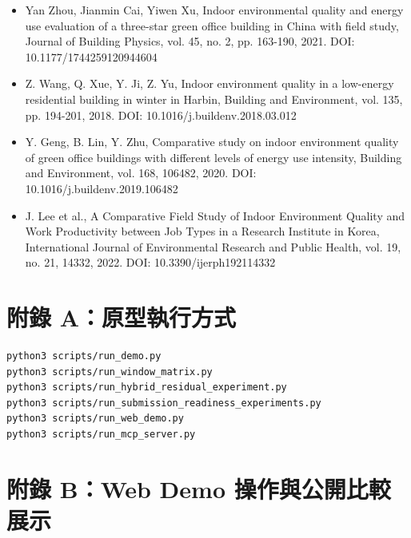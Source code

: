\documentclass[12pt,a4paper]{article}
\begin{document}
\begin{itemize}
\item [22] Yan Zhou, Jianmin Cai, Yiwen Xu, Indoor environmental quality and energy use evaluation of a three-star green office building in China with field study, Journal of Building Physics, vol. 45, no. 2, pp. 163-190, 2021. DOI: 10.1177/1744259120944604
\item [23] Z. Wang, Q. Xue, Y. Ji, Z. Yu, Indoor environment quality in a low-energy residential building in winter in Harbin, Building and Environment, vol. 135, pp. 194-201, 2018. DOI: 10.1016/j.buildenv.2018.03.012
\item [24] Y. Geng, B. Lin, Y. Zhu, Comparative study on indoor environment quality of green office buildings with different levels of energy use intensity, Building and Environment, vol. 168, 106482, 2020. DOI: 10.1016/j.buildenv.2019.106482
\item [25] J. Lee et al., A Comparative Field Study of Indoor Environment Quality and Work Productivity between Job Types in a Research Institute in Korea, International Journal of Environmental Research and Public Health, vol. 19, no. 21, 14332, 2022. DOI: 10.3390/ijerph192114332
\end{itemize}

\clearpage

\section*{附錄 A：原型執行方式}

\begin{lstlisting}[basicstyle=\footnotesize\ttfamily,breaklines=true,columns=flexible]
python3 scripts/run_demo.py
python3 scripts/run_window_matrix.py
python3 scripts/run_hybrid_residual_experiment.py
python3 scripts/run_submission_readiness_experiments.py
python3 scripts/run_web_demo.py
python3 scripts/run_mcp_server.py
\end{lstlisting}

\section*{附錄 B：Web Demo 操作與公開比較展示}
\end{document}
